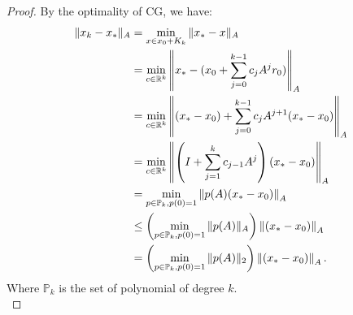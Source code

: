 \documentclass[../main/main.tex]{subfiles}
\begin{document}
\begin{proof}
  By the optimality of CG, we have:
  \begin{align*}
    \|x_{k}-x_{*}\|_{A} &= \min_{x\in x_{0}+K_{k}}\|x_{*}-x\|_{A}\\
                        &= \min_{c\in \mathbb{R} ^{k}} \left\|x_{*}- (x_{0}+ \sum_{j=0}^{k-1} c_{j}A^{j}r_{0})\right\|_{A}\\
                        &= \min_{c\in \mathbb{R} ^{k}} \left\|(x_{*}-x_{0})+ \sum_{j=0}^{k-1} c_{j}A^{j+1}(x_{*}-x_{0})\right\|_{A}\\
                        &= \min_{c\in \mathbb{R} ^{k}} \left\|\left(I +  \sum_{j=1}^{k} c_{j-1}A^{j}\right)(x_{*}-x_{0})\right\|_{A}\\
                        &= \min_{p\in \mathbb{P}_{k}, p(0)=1} \left\|p(A)(x_{*}-x_{0})\right\|_{A}\\
                        &\leq \left( \min_{p\in \mathbb{P}_{k}, p(0)=1} \|p(A)\|_{A}\right) \left\|(x_{*}-x_{0})\right\|_{A}\\
                        &= \left( \min_{p\in \mathbb{P}_{k}, p(0)=1} \|p(A)\|_{2}\right) \left\|(x_{*}-x_{0})\right\|_{A}
    .\end{align*}
  Where $\mathbb{P}_{k}$ is the set of polynomial of degree $k$.\\


\end{proof}
\end{document}
